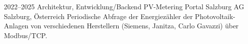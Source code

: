 \cventry
{2022--2025}
{Architektur, Entwicklung/Backend}
{PV-Metering Portal}
{Salzburg AG}
{Salzburg, Österreich}
{
  Periodische Abfrage der Energiezähler der Photovoltaik-Anlagen von verschiedenen
  Herstellern (Siemens, Janitza, Carlo Gavazzi) über Modbus/TCP.
}
